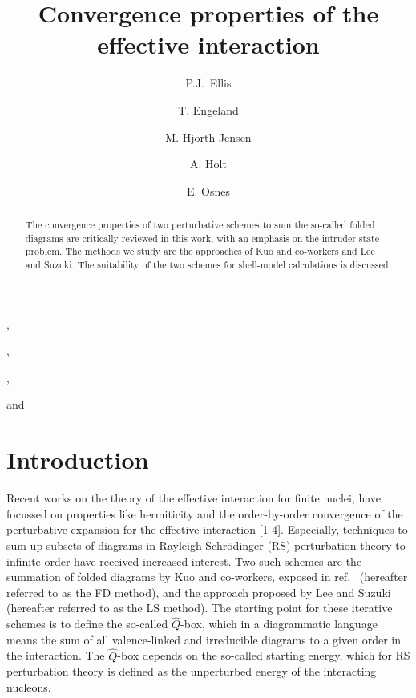 


\newcommand{\bra}[1]{\left\langle #1 \right|}
\newcommand{\ket}[1]{\left| #1 \right\rangle}




\begin{frontmatter}
\title{Convergence properties of the effective interaction}
\author[minn]{P.J.\ Ellis},
\author[oslo]{T. Engeland}, 
\author[oslo]{M. Hjorth-Jensen},
\author[oslo]{A. Holt} and
\author[oslo]{E. Osnes}
\address[minn]{School of Physics and Astronomy, University of Minnesota,
Minneapolis, Minnesota 55455, USA}
\address[oslo]{Department of Physics,
University of Oslo, N-0316 Oslo, Norway}





\begin{abstract}
The convergence properties of
two perturbative schemes to sum the so-called folded diagrams are
critically reviewed in this work, with an emphasis on the
intruder state problem. The methods we study are the
approaches of Kuo and co-workers and Lee and Suzuki. 
The suitability of the two schemes for shell-model
calculations is discussed.
\end{abstract}

\end{frontmatter}

\section{Introduction}

Recent works on the theory of the effective interaction
for finite nuclei, have focussed on
properties like hermiticity and the order-by-order
convergence of the perturbative
expansion for the effective interaction [1-4].
Especially, techniques to sum up subsets of diagrams 
in Rayleigh-Schr\"{o}dinger (RS) perturbation theory to infinite
order have received increased interest. Two such schemes are
the summation of folded diagrams by
Kuo and co-workers, exposed
in ref.\ \cite{ko90} (hereafter referred to as the FD method),
and the approach proposed by Lee and Suzuki \cite{ls80}
(hereafter referred to as the LS method).
The starting point for these iterative schemes is
to define the so-called $\hat{Q}$-box, which in a diagrammatic
language means the sum of all valence-linked and irreducible
diagrams to a given order in the interaction. The $\hat{Q}$-box depends
on the so-called starting energy, which for RS perturbation 
theory is defined as the unperturbed energy
of the interacting nucleons.


